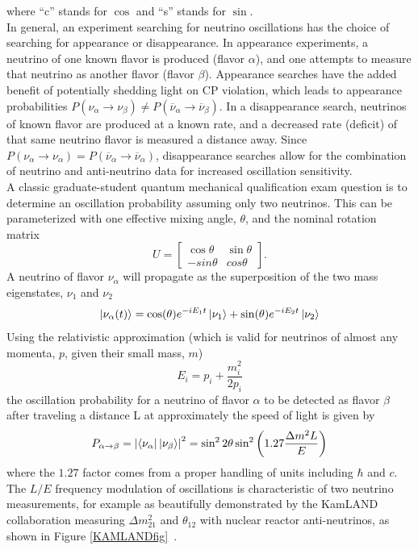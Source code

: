 where ``c'' stands for $\cos$ and ``s'' stands for $\sin$.\\

In general, an experiment searching for neutrino oscillations has the choice of searching for appearance or disappearance. In appearance experiments, a neutrino of one known flavor is produced (flavor $\alpha$), and one attempts to measure that neutrino as another flavor (flavor $\beta$). Appearance searches have the added benefit of potentially shedding light on CP violation, which leads to appearance probabilities $P(\nu_\alpha\rightarrow\nu_\beta) \ne P(\overline{\nu}_\alpha\rightarrow\overline{\nu}_\beta)$. In a disappearance search, neutrinos of known flavor are produced at a known rate, and a decreased rate (deficit) of that same neutrino flavor is measured a distance away. Since $P(\nu_\alpha\rightarrow\nu_\alpha) = P(\overline{\nu}_\alpha\rightarrow\overline{\nu}_\alpha)$, disappearance searches allow for the combination of neutrino and anti-neutrino data for increased oscillation sensitivity.\\

A classic graduate-student quantum mechanical qualification exam question is to determine an oscillation probability assuming only two neutrinos. This can be parameterized with one effective mixing angle, $\theta$, and the nominal rotation matrix
\begin{equation}\label{rotmatrix}
U = \begin{bmatrix} \cos\theta & \sin\theta \\ -sin\theta & cos\theta \end{bmatrix}.
\end{equation}
A neutrino of flavor $\nu_\alpha$ will propagate as the superposition of the two mass eigenstates, $\nu_1$ and $\nu_2$
\begin{equation}\label{twonupropagation}
\Ket{\nu_\alpha (t)} = \cos(\theta)e^{-iE_1t}\ket{\nu_1} + \sin(\theta)e^{-iE_2t}\ket{\nu_2} 
\end{equation}
Using the relativistic approximation (which is valid for neutrinos of almost any momenta, $p$, given their small mass, $m$)
\begin{equation}\label{relapprox}
E_i = p_i + \frac{m_i^2}{2p_i}
\end{equation}
the oscillation probability for a neutrino of flavor $\alpha$ to be detected as flavor $\beta$ after traveling a distance L at approximately the speed of light is given by
\begin{equation}\label{twoneutrinooscprob0}
P_{\alpha \rightarrow \beta} = \left|\Bra{\nu_\alpha}\Ket{\nu_\beta}\right|^2 = \sin^2 2\theta \sin^2 \left( 1.27 \frac{\Delta m^2 L}{E} \right)
\end{equation}
where the $1.27$ factor comes from a proper handling of units including $\hbar$ and $c$. The $L/E$ frequency modulation of oscillations is characteristic of two neutrino measurements, for example as beautifully demonstrated by the KamLAND collaboration measuring $\Delta m_{21}^2$ and $\theta_{12}$ with nuclear reactor anti-neutrinos, as shown in Figure \ref{KAMLANDfig}~\cite{KAMLANDsource}.

